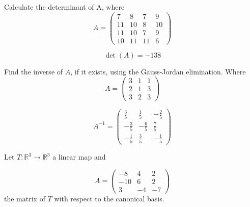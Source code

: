 \begin{questions}

\question Calculate the determinant of A, where
$$
A=\left(\begin{array}{rrrr}
7 & 8 & 7 & 9 \\
11 & 10 & 8 & 10 \\
11 & 10 & 7 & 9 \\
10 & 11 & 11 & 6
\end{array}\right)
$$

\begin{solution}
$$\det(A)=-138$$
\end{solution}

\question Find the inverse of $A$, if it exists, using the Gauss-Jordan elimination. Where
$$
A=\left(\begin{array}{rrr}
3 & 1 & 1 \\
2 & 1 & 3 \\
3 & 2 & 3
\end{array}\right)
$$

\begin{solution}
$$A^{-1}=\left(\begin{array}{rrr}
\frac{3}{5} & \frac{1}{5} & -\frac{2}{5} \\
-\frac{3}{5} & -\frac{6}{5} & \frac{7}{5} \\
-\frac{1}{5} & \frac{3}{5} & -\frac{1}{5}
\end{array}\right)$$
\end{solution}

\question Let $T:\mathbb{R}^3\rightarrow\mathbb{R}^3$  a linear map and
 
$$
A=\left(\begin{array}{rrr}
-8 & 4 & 2 \\
-10 & 6 & 2 \\
3 & -4 & -7
\end{array}\right)
$$
the matrix of $T$ with respect to the canonical basis.
\end{questions}
